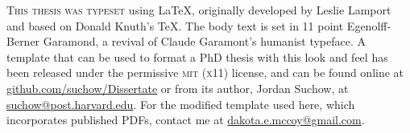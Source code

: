 \newpage


\vspace*{200pt}

\begin{center}
\parbox{210pt}{\lettrine[lines=3,slope=-2pt,nindent=-4pt]{\textcolor{SchoolColor}{T}}{his thesis was typeset} using \LaTeX, originally developed by Leslie Lamport and based on Donald Knuth's \TeX. The body text is set in 11 point Egenolff-Berner Garamond, a revival of Claude Garamont's humanist typeface. A template that can be used to format a PhD thesis with this look and feel has been released under the permissive \textsc{mit} (\textsc{x}11) license, and can be found online at \href{https://github.com/suchow/Dissertate}{github.com/suchow/Dissertate} or from its author, Jordan Suchow, at \href{mailto:suchow@post.harvard.edu}{suchow@post.harvard.edu}. For the modified template used here, which incorporates published PDFs, contact me at \href{mailto:dakota.e.mccoy@gmail.com}{dakota.e.mccoy@gmail.com}.}
\end{center}